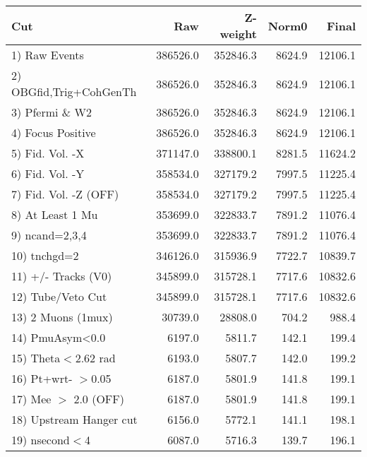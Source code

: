  \begin{table}[h!]\centering
 \begin{tabular}{||l||r|r|r|r||}
 \hline
 \hline
 Cut & Raw & Z-weight & Norm0 & Final \\
 \hline
  1) Raw Events           &    386526.0 &    352846.3 &      8624.9 &     12106.1 \\
  2) OBGfid,Trig+CohGenTh &    386526.0 &    352846.3 &      8624.9 &     12106.1 \\
  3) Pfermi \& W2         &    386526.0 &    352846.3 &      8624.9 &     12106.1 \\
  4) Focus Positive       &    386526.0 &    352846.3 &      8624.9 &     12106.1 \\
  5) Fid. Vol. -X         &    371147.0 &    338800.1 &      8281.5 &     11624.2 \\
  6) Fid. Vol. -Y         &    358534.0 &    327179.2 &      7997.5 &     11225.4 \\
  7) Fid. Vol. -Z (OFF)   &    358534.0 &    327179.2 &      7997.5 &     11225.4 \\
  8) At Least 1 Mu        &    353699.0 &    322833.7 &      7891.2 &     11076.4 \\
  9) ncand=2,3,4          &    353699.0 &    322833.7 &      7891.2 &     11076.4 \\
 10) tnchgd=2             &    346126.0 &    315936.9 &      7722.7 &     10839.7 \\
 11) +/- Tracks (V0)      &    345899.0 &    315728.1 &      7717.6 &     10832.6 \\
 12) Tube/Veto Cut        &    345899.0 &    315728.1 &      7717.6 &     10832.6 \\
 13) 2 Muons (1mux)       &     30739.0 &     28808.0 &       704.2 &       988.4 \\
 14) PmuAsym<0.0          &      6197.0 &      5811.7 &       142.1 &       199.4 \\
 15) Theta$<$2.62 rad     &      6193.0 &      5807.7 &       142.0 &       199.2 \\
 16) Pt+wrt- $>$0.05      &      6187.0 &      5801.9 &       141.8 &       199.1 \\
 17) Mee $>$ 2.0  (OFF)   &      6187.0 &      5801.9 &       141.8 &       199.1 \\
 18) Upstream Hanger cut  &      6156.0 &      5772.1 &       141.1 &       198.1 \\
 19) nsecond$<$4          &      6087.0 &      5716.3 &       139.7 &       196.1 \\

\end{tabular}
\end{table}
